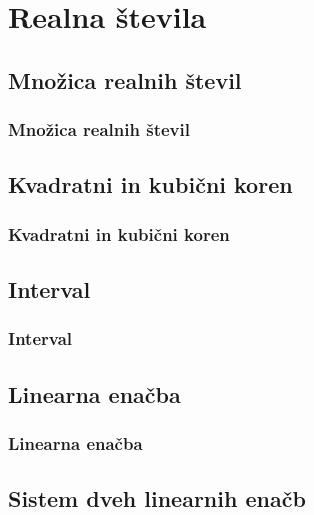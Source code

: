 \section{Realna števila}

\begin{frame}
    \sectionpage
\end{frame}

\begin{frame}
\end{frame}

    \subsection{Množica realnih števil}

        \begin{frame}
            \frametitle{Množica realnih števil}
        \end{frame}

    \subsection{Kvadratni in kubični koren}

        \begin{frame}
            \frametitle{Kvadratni in kubični koren}
        \end{frame}

    \subsection{Interval}

        \begin{frame}
            \frametitle{Interval}
        \end{frame}

    \subsection{Linearna enačba}

        \begin{frame}
            \frametitle{Linearna enačba}
        \end{frame}

    \subsection{Sistem dveh linearnih enačb}

